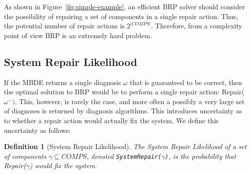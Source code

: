 \documentclass[letterpaper]{article}
\newcommand\meir[1]{\textcolor{red}{meir: #1}}
\newtheorem{definition}{Definition}
\newcommand\sysrep[1]{{\tt SystemRepair(#1)}}
\newcommand{\COMPS}{\textit{COMPS}}
\begin{document}

As shown in Figure~\ref{fig:simple-example}, an efficient BRP solver should consider the possibility of repairing a set of components in a single repair action. Thus, the potential number of repair actions is %
$2^{|\COMPS|}$. Therefore, from a complexity point of view BRP is an extremely hard problem.





\subsection{System Repair Likelihood}
If the MBDE returns a single diagnosis $\omega$ that is guaranteed to be correct, then the optimal solution to BRP would be to perform a single repair action: Repair($\omega^{-})$. %
This, however, is rarely the case, and more often a possibly a very large set of diagnoses is returned by diagnosis algorithms. This introduces uncertainty as to whether a repair action would actually fix the system. We define this uncertainty as follows:

\begin{definition}[System Repair Likelihood]
The System Repair Likelihood of a set of components $\gamma\subseteq \COMPS$, denoted \sysrep{$\gamma$}, is the probability that Repair($\gamma$) would fix the system.
\end{definition}
\end{document}
